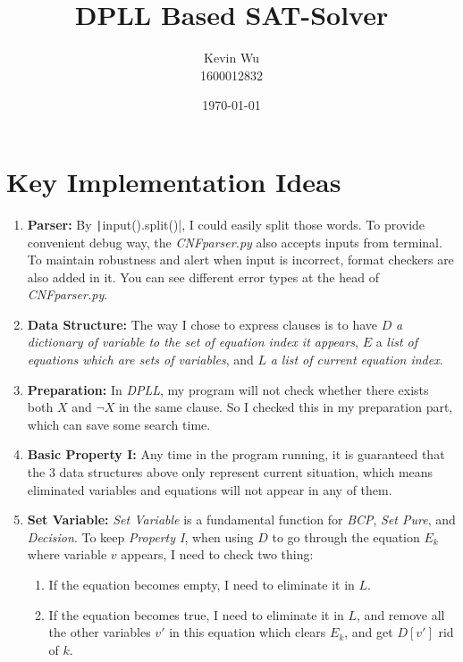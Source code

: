 \documentclass[a4paper,10pt]{article}
\title{DPLL Based SAT-Solver}
\author{Kevin Wu\\1600012832}
\date{\today}
\begin{document}
\maketitle
\vspace{-20pt}
\section{Key Implementation Ideas}
\begin{enumerate}
\setlength{\itemsep}{.1em}
\item \textbf{Parser:} By \texttt|input().split()|,
    I could easily split those words. To provide convenient debug 
    way, the \textit{CNFparser.py} also accepts inputs from terminal.
    To maintain robustness and alert when input is incorrect,
    format checkers are also added in it.
    You can see different error types at the head of \textit{CNFparser.py}.
\item \textbf{Data Structure:} The way I chose to express clauses is to have $D$  
    \textit{a dictionary of variable to the set of equation index it appears}, $E$ a 
    \textit{list of equations which are sets of variables}, and $L$ \textit{a list of current
    equation index}.
\item \textbf{Preparation:}
    In \textit{DPLL}, my program will not check whether there exists both $X$ and
    $\neg X$ in the same clause. So I checked this in my preparation part, which can
    save some search time.
\item \textbf{Basic Property I:} Any time in the program running, it is guaranteed
    that the $3$ data structures above
    only represent current situation, which means eliminated variables and 
    equations will not appear in any of them.
\item \textbf{Set Variable:} \textit{Set Variable} is a fundamental function for \textit{BCP},
    \textit{Set Pure}, and \textit{Decision}.
    To keep \textit{Property I}, when using $D$ to go through
    the equation $E_k$ where variable $v$ appears,
    I need to check two thing: 
    \begin{enumerate}
        \small\setlength{\itemsep}{.1em}
        \item If the equation becomes empty, I need to eliminate it in $L$.
        \item If the equation becomes true, I need to eliminate it in $L$,
            and remove all the other variables $v'$ in this equation which clears $E_k$,
            and get $D[v']$ rid of $k$.
    \end{enumerate}

\end{enumerate}
\end{document}
